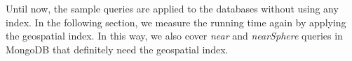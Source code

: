 \documentclass[a4paper,12pt]{article}
\begin{document}


Until now, the sample queries are applied to the databases without using any index. 
In the following section, we measure the running time again by applying the geospatial index.
In this way, we also cover \textit{near} and \textit{nearSphere} queries in MongoDB that definitely need the geospatial index.  


\end{document}
